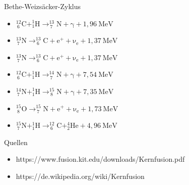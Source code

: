 \documentclass[aspectratio=169,xcolor=dvipsnames,14pt]{beamer}
\begin{document}
{
\begin{frame}{Bethe-Weizsäcker-Zyklus}

\begin{itemize}
\color{LightGrey}
\item
\begin{math}
    {\displaystyle \mathrm {_{\ 6}^{12}C+_{1}^{1}H\to _{\ 7}^{13}N+\gamma+1,96 \ MeV}}
\end{math}

\item 
\begin{math}
    {\displaystyle \mathrm {_{\ 7}^{13}N \to _{\ 6}^{13}C+ {e}^{+} + \nu_{e}+1,37 \ MeV }}
\end{math}

\item \begin{math}
    {\displaystyle \mathrm {_{\ 7}^{13}N \to _{\ 6}^{13}C+ {e}^{+} + \nu_{e}+1,37 \ MeV }}
\end{math}

\item
\begin{math}
    {\displaystyle \mathrm {_{\ 6}^{12}C+_{1}^{1}H\to _{\ 7}^{14}N+\gamma+7,54 \ MeV}}
\end{math}

\item
\begin{math}
    {\displaystyle \mathrm {_{\ 7}^{14}N+_{1}^{1}H\to _{\ 8}^{15}N+\gamma+7,35 \ MeV}}
\end{math}

\item
\begin{math}
    {\displaystyle \mathrm {_{\ 8}^{15}O \to _{\ 7}^{15}N+{e}^{+} + \nu_{e}+1,73 \ MeV}}
\end{math}

\item
\begin{math}
    {\displaystyle \mathrm {_{\ 7}^{15}N+_{1}^{1}H \to _{\ 6}^{12}C+_{2}^{4}He+4,96 \ MeV}}
\end{math}

\end{itemize}





\end{frame}
}

{
\begin{frame}{Quellen}
\begin{itemize}
    \color{LightGrey}
\item https://www.fusion.kit.edu/downloads/Kernfusion.pdf
\item https://de.wikipedia.org/wiki/Kernfusion
\end{itemize}
\end{frame}
}
\end{document}
